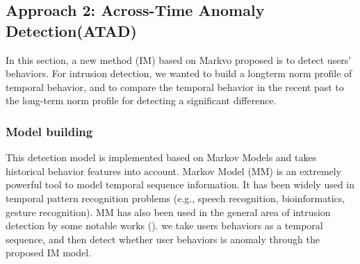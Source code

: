 \documentclass[conference]{IEEEtran}
\begin{document}
\subsection{Approach 2: Across-Time Anomaly Detection(ATAD)}

In this section, a new method (IM) based on Markvo proposed is to detect users' behaviors. For intrusion detection, we wanted to build a longterm norm profile of temporal behavior, and to
compare the temporal behavior in the recent past to the long-term norm profile for detecting a significant difference.
 

\subsubsection{Model building}

This detection model is implemented based on Markov Models
and takes historical behavior features into account. 
Markov Model (MM)\cite{b21} is an extremely powerful
tool to model temporal sequence information. It has been
widely used in temporal pattern recognition problems (e.g.,
speech recognition, bioinformatics, gesture recognition)\cite{b23}. MM has also been used
in the general area of intrusion detection by some notable
works (\cite{b21}). we take users behaviors as a temporal sequence, and then detect whether user behaviors is anomaly through the proposed IM model.
\end{document}
